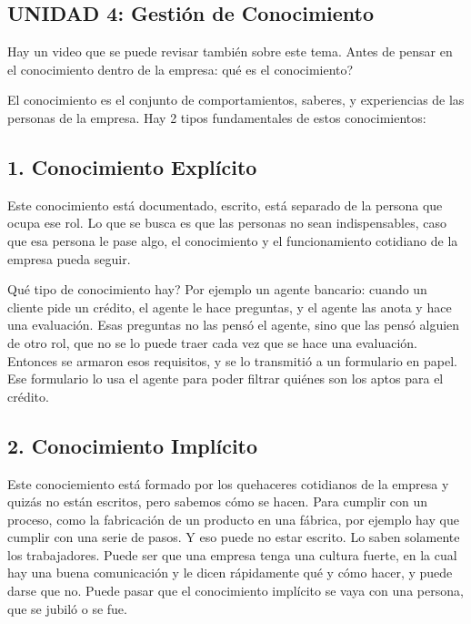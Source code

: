 \clearpage
\twocolumn
\hypertarget{unidad-4-gestiuxf3n-de-conocimiento}{%
\subsection*{UNIDAD 4: Gestión de Conocimiento}\label{unidad-4-gestiuxf3n-de-conocimiento}}

Hay un video que se puede revisar también sobre este tema. Antes de
pensar en el conocimiento dentro de la empresa: qué es el conocimiento?

El conocimiento es el conjunto de comportamientos, saberes, y
experiencias de las personas de la empresa. Hay 2 tipos fundamentales de
estos conocimientos:

\hypertarget{conocimiento-expluxedcito}{%
\subsection{1. Conocimiento Explícito}\label{conocimiento-expluxedcito}}

Este conocimiento está documentado, escrito, está separado de la persona
que ocupa ese rol. Lo que se busca es que las personas no sean
indispensables, caso que esa persona le pase algo, el conocimiento y el
funcionamiento cotidiano de la empresa pueda seguir.

Qué tipo de conocimiento hay? Por ejemplo un agente bancario: cuando un
cliente pide un crédito, el agente le hace preguntas, y el agente las
anota y hace una evaluación. Esas preguntas no las pensó el agente, sino
que las pensó alguien de otro rol, que no se lo puede traer cada vez que
se hace una evaluación. Entonces se armaron esos requisitos, y se lo
transmitió a un formulario en papel. Ese formulario lo usa el agente
para poder filtrar quiénes son los aptos para el crédito.

\hypertarget{conocimiento-impluxedcito}{%
\subsection{2. Conocimiento Implícito}\label{conocimiento-impluxedcito}}

Este conociemiento está formado por los quehaceres cotidianos de la
empresa y quizás no están escritos, pero sabemos cómo se hacen. Para
cumplir con un proceso, como la fabricación de un producto en una
fábrica, por ejemplo hay que cumplir con una serie de pasos. Y eso puede
no estar escrito. Lo saben solamente los trabajadores. Puede ser que una
empresa tenga una cultura fuerte, en la cual hay una buena comunicación
y le dicen rápidamente qué y cómo hacer, y puede darse que no. Puede
pasar que el conocimiento implícito se vaya con una persona, que se
jubiló o se fue.

